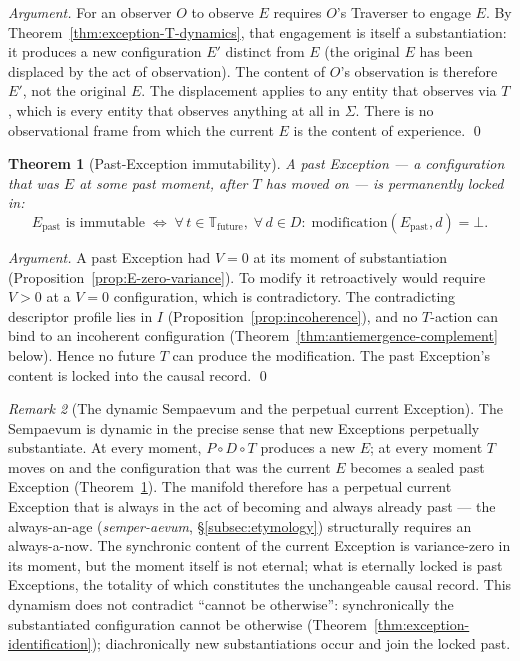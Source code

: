 \documentclass[11pt,a4paper]{article}
\newtheorem{theorem}{Theorem}[section]
\theoremstyle{definition}
\theoremstyle{remark}
\newtheorem{remark}[theorem]{Remark}
\begin{document}
\begin{proof}[Argument]
For an observer $O$ to observe $E$ requires $O$'s Traverser to engage $E$. By Theorem~\ref{thm:exception-T-dynamics}, that engagement is itself a substantiation: it produces a new configuration $E'$ distinct from $E$ (the original $E$ has been displaced by the act of observation). The content of $O$'s observation is therefore $E'$, not the original $E$. The displacement applies to any entity that observes via $T$, which is every entity that observes anything at all in $\Sigma$. There is no observational frame from which the current $E$ is the content of experience. \qed
\end{proof}

\begin{theorem}[Past-Exception immutability]\label{thm:past-immutability}
A past Exception --- a configuration that was $E$ at some past moment, after $T$ has moved on --- is permanently locked in:
\[
E_{\mathrm{past}} \text{ is immutable} \;\Longleftrightarrow\; \forall\, t \in \mathbb{T}_{\mathrm{future}},\;\forall\, d \in D :\; \mathrm{modification}(E_{\mathrm{past}}, d) = \bot.
\]
\end{theorem}

\begin{proof}[Argument]
A past Exception had $V = 0$ at its moment of substantiation (Proposition~\ref{prop:E-zero-variance}). To modify it retroactively would require $V > 0$ at a $V = 0$ configuration, which is contradictory. The contradicting descriptor profile lies in $I$ (Proposition~\ref{prop:incoherence}), and no $T$-action can bind to an incoherent configuration (Theorem~\ref{thm:antiemergence-complement} below). Hence no future $T$ can produce the modification. The past Exception's content is locked into the causal record. \qed
\end{proof}

\begin{remark}[The dynamic Sempaevum and the perpetual current Exception]\label{rem:perpetual-E}
The Sempaevum is dynamic in the precise sense that new Exceptions perpetually substantiate. At every moment, $P\circ D\circ T$ produces a new $E$; at every moment $T$ moves on and the configuration that was the current $E$ becomes a sealed past Exception (Theorem~\ref{thm:past-immutability}). The manifold therefore has a perpetual current Exception that is always in the act of becoming and always already past --- the always-an-age (\emph{semper-aevum}, \S\ref{subsec:etymology}) structurally requires an always-a-now. The synchronic content of the current Exception is variance-zero in its moment, but the moment itself is not eternal; what is eternally locked is past Exceptions, the totality of which constitutes the unchangeable causal record. This dynamism does not contradict ``cannot be otherwise'': synchronically the substantiated configuration cannot be otherwise (Theorem~\ref{thm:exception-identification}); diachronically new substantiations occur and join the locked past.
\end{remark}
\end{document}
